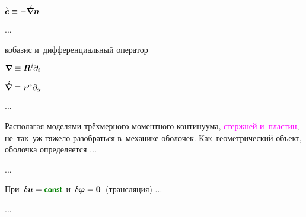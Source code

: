 \begin{otherlanguage}{russian}
${\mathtwoabove{\bm{c}} \equiv - \boldnablaflat \bm{n}}$

...

\noindent кобазис и~дифференциальный оператор 

${\bm{\nabla}\hspace{-0.2ex} \equiv \bm{R}^{\hspace{.1ex}i} \hspace{-0.1ex} \partial_i}$

${\boldnablaflat \equiv \hspace{.1ex} \bm{r}^\alpha \hspace{-0.1ex} \partial_{\hspace{-0.1ex}\alpha}}$

...




\end{otherlanguage}



\begin{otherlanguage}{russian}

Располагая моделями трёхмерного моментного континуума, \textcolor{magenta}{стержней и~пластин}, не~так~уж тяжело разобраться в~механике оболочек. Как~геометрический объект, оболочка определяется ...

...







\end{otherlanguage}



\begin{otherlanguage}{russian}

При~${\variation{\fieldofdisplacements} = \boldconst}$ и~${\updelta\hspace{-0.1ex}\bm{\varphi} = \bm{0}}$~(трансляция) ...

...



\end{otherlanguage}

